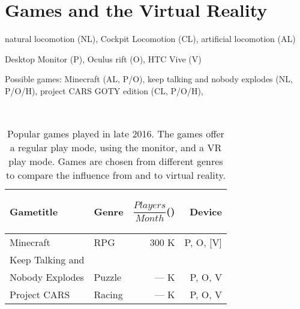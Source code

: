 
\section{Games and the Virtual Reality}


natural locomotion (NL), Cockpit Locomotion (CL), artificial locomotion (AL)

Desktop Monitor (P), Oculus rift (O), HTC Vive (V)

Possible games: Minecraft (AL, P/O), keep talking and nobody explodes (NL, P/O/H), project CARS GOTY edition (CL, P/O/H),  

\begin{table}[h]
	\caption{Popular games played in late 2016. The games offer a regular play mode, using the monitor, and a VR play mode. Games are chosen from different genres to compare the influence from and to virtual reality.}~\label{tab:popularGames}
	
	\begin{tabular*}{\columnwidth}{ l l r r }
		Gametitle & Genre\footnotemark & \parbox[c][2.2em][t]{2cm}{\begin{flushright}$\dfrac{Players}{Month}$(\footnotemark)\end{flushright}} & Device \\
		\hline
		Minecraft & RPG & 300 K & P, O, [V]\footnotemark \\
		Keep Talking and \\Nobody Explodes & Puzzle & --- K & P, O, V \\
		Project CARS & Racing & --- K & P, O, V \\
	\end{tabular*}
	
\end{table}

